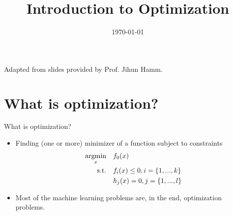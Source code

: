 \documentclass[notes]{beamer}
\title[Opt for ML]{Introduction to Optimization}
\date[\today]{\today}
\begin{document}



\begin{frame}
	\titlepage
	\begin{center}
		Adapted from slides provided by Prof. Jihun Hamm.		
	\end{center}

\end{frame}

\section{What is optimization?}

\begin{frame}{What is optimization?}
	\begin{itemize}
		\item<1-> Finding (one or more)  minimizer of a function subject to constraints
		      \begin{equation}
			      \begin{aligned}
				      \mathop{\mathrm{argmin}}_x \quad     & f_0(x)                        \\
				      \textrm{s.t.} \quad & f_i(x) \le 0, i = \{1,...,k\} \\
				      \quad               & h_j(x) = 0, j = \{1,...,l\}   \\
			      \end{aligned}
		      \end{equation}
		\item<2-> Most of the machine learning problems are, in the end, optimization problems.
	\end{itemize}
\end{frame}
\end{document}
